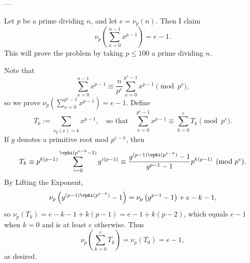 
---

Let $p$ be a prime dividing $n$, and let $e=\nu_p(n)$. Then I claim \[\nu_p\left(\sum_{x=0}^{n-1}x^{p-1}\right)=e-1.\]
This will prove the problem by taking $p\le100$ a prime dividing $n$.

Note that \[\sum_{x=0}^{n-1}x^{p-1}\equiv\frac n{p^e}\sum_{x=0}^{p^e-1}x^{p-1}\pmod{p^e},\]
so we prove $\nu_p\left(\sum_{x=0}^{p^e-1}x^{p-1}\right)=e-1$. Define \[T_k:=\sum_{\nu_p(x)=k}x^{p-1},\quad\text{so that}\quad\sum_{x=0}^{p^e-1}x^{p-1}\equiv\sum_{k=0}^eT_k\pmod{p^e}.\]
If $g$ denotes a primitive root mod $p^{e-k}$, then \[T_k\equiv p^{k(p-1)}\sum_{i=0}^{\vphi(p^{e-k}-1)}g^{i(p-1)}\equiv\frac{g^{(p-1)\vphi(p^{e-k})}-1}{g^{p-1}-1}p^{k(p-1)}\pmod{p^e}.\]
By Lifting the Exponent, \[\nu_p\left(g^{(p-1)\vphi(p^{e-k})}-1\right)=\nu_p\left(g^{p-1}-1\right)+e-k-1,\]
so $\nu_p(T_k)=e-k-1+k(p-1)=e-1+k(p-2)$, which equals $e-1$ when $k=0$ and is at least $e$ otherwise. Thus \[\nu_p\left(\sum_{k=0}^eT_k\right)=\nu_p(T_0)=e-1,\]
as desired.
